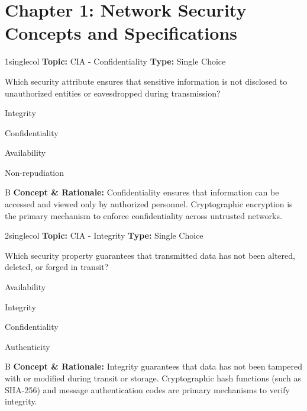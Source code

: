 \section{Chapter 1: Network Security Concepts and Specifications}

\begin{qcard}{1}{singlecol}
\textcolor{darkslate!75}{\small\textbf{Topic:} CIA - Confidentiality \hfill \textbf{Type:} Single Choice}\vspace{0.4em}\par
Which security attribute ensures that sensitive information is not disclosed to unauthorized entities or eavesdropped during transmission?
\begin{qoptions}
\item Integrity
\item Confidentiality
\item Availability
\item Non-repudiation
\end{qoptions}
\end{qcard}
\nopagebreak
\begin{explainbox}{B}
\textbf{Concept \& Rationale:} Confidentiality ensures that information can be accessed and viewed only by authorized personnel. Cryptographic encryption is the primary mechanism to enforce confidentiality across untrusted networks.
\end{explainbox}

\begin{qcard}{2}{singlecol}
\textcolor{darkslate!75}{\small\textbf{Topic:} CIA - Integrity \hfill \textbf{Type:} Single Choice}\vspace{0.4em}\par
Which security property guarantees that transmitted data has not been altered, deleted, or forged in transit?
\begin{qoptions}
\item Availability
\item Integrity
\item Confidentiality
\item Authenticity
\end{qoptions}
\end{qcard}
\nopagebreak
\begin{explainbox}{B}
\textbf{Concept \& Rationale:} Integrity guarantees that data has not been tampered with or modified during transit or storage. Cryptographic hash functions (such as SHA-256) and message authentication codes are primary mechanisms to verify integrity.
\end{explainbox}

